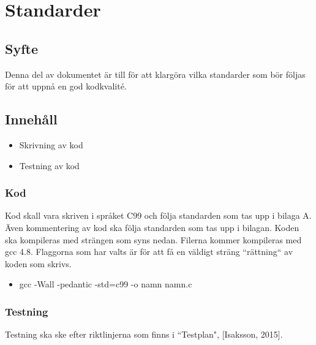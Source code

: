 \section{Standarder}

\subsection{Syfte}
Denna del av dokumentet är till för att klargöra vilka standarder som bör följas för att uppnå en god kodkvalité.

\subsection{Innehåll}
\begin{itemize}
\item Skrivning av kod
\item Testning av kod
\end{itemize}

\subsubsection{Kod}
Kod skall vara skriven i språket C99 och följa standarden som tas upp i bilaga A. Även kommentering av kod ska följa standarden som tas upp i bilagan. 
\newline
\newline
Koden ska kompileras med strängen som syns nedan. Filerna kommer kompileras med gcc 4.8. Flaggorna som har valts är för att få en väldigt sträng ``rättning`` av koden som skrivs. 

\begin{itemize}
\item gcc -Wall -pedantic -std=c99 -o namn namn.c
\end{itemize}

\subsubsection{Testning}
Testning ska ske efter riktlinjerna som finns i ``Testplan", [Isaksson, 2015]. 
